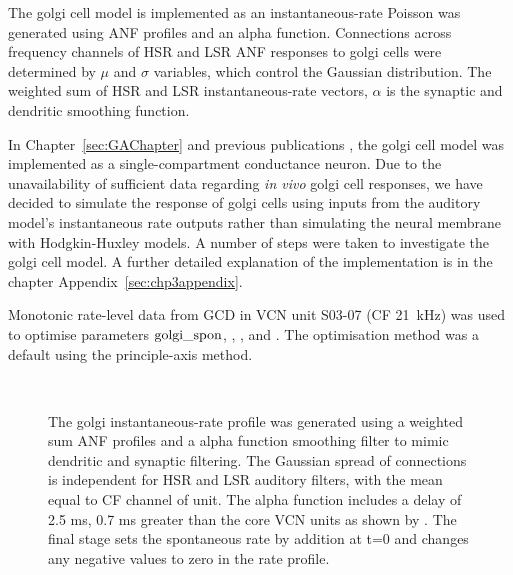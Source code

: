 The golgi cell model is implemented as an instantaneous-rate Poisson
was generated using ANF profiles and an alpha function. Connections
across frequency channels of HSR and LSR ANF responses to golgi cells
were determined by $\mu$ and $\sigma$ variables, which control the
Gaussian distribution. The weighted sum of HSR and LSR
instantaneous-rate vectors, $\alpha$ is the synaptic and dendritic
smoothing function.  \medskip{}

In Chapter~\ref{sec:GAChapter} and previous publications
\citep{EagerGraydenEtAl:2006a}, the golgi cell model was implemented
as a single-compartment conductance neuron. Due to the unavailability
of sufficient data regarding \emph{in vivo} golgi cell responses, we
have decided to simulate the response of golgi cells using inputs from
the auditory model's instantaneous rate outputs rather than simulating
the neural membrane with Hodgkin-Huxley models.  A number of steps
were taken to investigate the golgi cell model. A further detailed
explanation of the implementation is in the chapter
Appendix~\ref{sec:chp3appendix}.

\medskip{}

Monotonic rate-level data from GCD in VCN \citep{GhoshalKim:1996} unit
S03-07 (CF 21~kHz) was used to optimise parameters ${\rm
golgi\_spon}$, \wLSRGLG, \wHSRGLG, and \sANFGLG\@.  The optimisation
method was a default using the principle-axis method.

 \begin{figure}[h!]
   \centering
  \\
  \caption{The golgi instantaneous-rate profile was generated using a weighted sum ANF
     profiles and a alpha function smoothing filter to mimic dendritic and synaptic filtering. The Gaussian spread of connections is independent for HSR and LSR auditory filters, with the mean equal to CF channel of unit. The alpha function includes a delay of 2.5 ms, 0.7 ms greater than the core VCN units as shown by \citet{GhoshalKim:1997}. The final stage sets the spontaneous rate by addition at t=0 and changes any negative values to zero in the rate profile.  
}\label{fig:GolgiDiagram}
 \end{figure}

